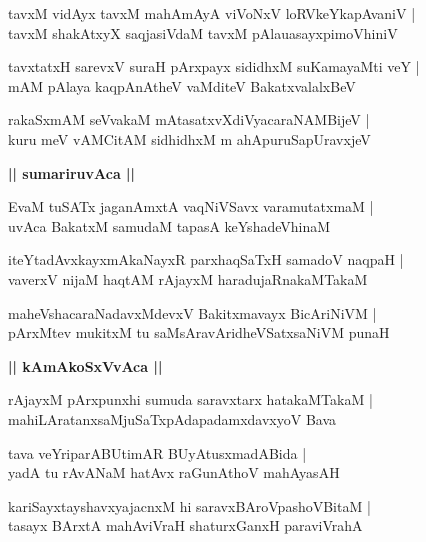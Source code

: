 \documentclass[twoside,12pt,openright]{book}
\newcounter{shloka}[chapter]
\def\uvaca#1{\centerline{{\large\textbf{#1}}}}
\begin{document}
\begin{shloka}%
tavxM vidAyx tavxM mahAmAyA viVoNxV loRVkeYkapAvaniV |\\
tavxM shakAtxyX saqjasiVdaM tavxM pAlauasayxpimoVhiniV 
\end{shloka}

\begin{shloka}%
tavxtatxH sarevxV suraH pArxpayx sididhxM suKamayaMti veY |\\
mAM pAlaya kaqpAnAtheV vaMditeV BakatxvalalxBeV 
\end{shloka}

\begin{shloka}%
rakaSxmAM seVvakaM mAtasatxvXdiVyacaraNAMBijeV |\\
kuru meV vAMCitAM sidhidhxM m ahApuruSapUravxjeV 
\end{shloka}

\uvaca{|| sumariruvAca ||}

\begin{shloka}%
EvaM tuSATx jaganAmxtA vaqNiVSavx varamutatxmaM |\\
uvAca BakatxM samudaM tapasA keYshadeVhinaM 
\end{shloka}

\begin{shloka}%
iteYtadAvxkayxmAkaNayxR parxhaqSaTxH samadoV naqpaH |\\
vaverxV nijaM haqtAM rAjayxM haradujaRnakaMTakaM 
\end{shloka}

\begin{shloka}%
maheVshacaraNadavxMdevxV Bakitxmavayx BicAriNiVM |\\
pArxMtev mukitxM  tu saMsAravAridheVSatxsaNiVM punaH 
\end{shloka}

\uvaca{|| kAmAkoSxVvAca ||}

\begin{shloka}%
rAjayxM pArxpunxhi sumuda saravxtarx hatakaMTakaM |\\
mahiLAratanxsaMjuSaTxpAdapadamxdavxyoV Bava 
\end{shloka}

\begin{shloka}%
tava veYriparABUtimAR BUyAtusxmadABida |\\
yadA tu rAvANaM hatAvx raGunAthoV mahAyasAH
\end{shloka}

\begin{shloka}%
kariSayxtayshavxyajacnxM hi saravxBAroVpashoVBitaM |\\
tasayx BArxtA mahAviVraH shaturxGanxH paraviVrahA 
\end{shloka}
\end{document}
